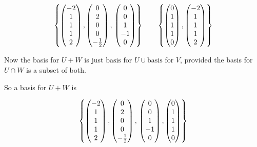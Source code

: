 \documentclass[a4paper]{article}
\begin{document}
	\[ \left\{  
	 \begin{pmatrix}
	-2 \\
	1 \\
	1 \\
	1 \\
	2
	\end{pmatrix} , 
	\begin{pmatrix}
	0\\
	2\\
	0\\
	0\\
	-\frac{1}{2}
	\end{pmatrix},\\
	\begin{pmatrix}
	0\\
	0\\
	1\\
	-1\\
	0
	\end{pmatrix}\right\} \qquad 	
	\left\{  \begin{pmatrix}
	0 \\
	1 \\
	1 \\
	1 \\
	0
	\end{pmatrix},  \begin{pmatrix}
	-2 \\
	1 \\
	1 \\
	1 \\
	2
	\end{pmatrix} \right\}  \]
	
	Now the basis for $ U + W $ is just $ \text{basis for }U \cup \text{basis for }V $, provided the basis for $ U \cap W $ is a subset of both. 
	
	So a basis for $ U + W $ is 
	
	\[  \left\{  
	\begin{pmatrix}
	-2 \\
	1 \\
	1 \\
	1 \\
	2
	\end{pmatrix} , 
	\begin{pmatrix}
	0\\
	2\\
	0\\
	0\\
	-\frac{1}{2}
	\end{pmatrix},\\
	\begin{pmatrix}
	0\\
	0\\
	1\\
	-1\\
	0
	\end{pmatrix},
	\begin{pmatrix}
	0 \\
	1 \\
	1 \\
	1 \\
	0
	\end{pmatrix} \right\}  \]
	
\end{document}
